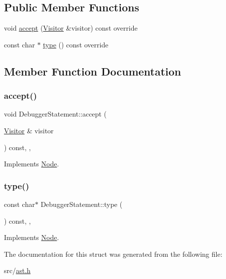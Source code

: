 \subsection*{Public Member Functions}
\begin{DoxyCompactItemize}
\item 
void \hyperlink{struct_debugger_statement_adb69027b0b27e1a8f74f4ddea5957799}{accept} (\hyperlink{struct_visitor}{Visitor} \&visitor) const override
\item 
const char $\ast$ \hyperlink{struct_debugger_statement_a3484d4e9900b72324bf5eb55da9492dd}{type} () const override
\end{DoxyCompactItemize}


\subsection{Member Function Documentation}
\mbox{\label{struct_debugger_statement_adb69027b0b27e1a8f74f4ddea5957799}} 
\subsubsection{\texorpdfstring{accept()}{accept()}}
{\footnotesize\ttfamily void Debugger\+Statement\+::accept (\begin{DoxyParamCaption}\item[{\hyperlink{struct_visitor}{Visitor} \&}]{visitor }\end{DoxyParamCaption}) const\hspace{0.3cm}{\ttfamily [inline]}, {\ttfamily [override]}, {\ttfamily [virtual]}}



Implements \hyperlink{struct_node_a10bd7af968140bbf5fa461298a969c71}{Node}.

\mbox{\label{struct_debugger_statement_a3484d4e9900b72324bf5eb55da9492dd}} 
\subsubsection{\texorpdfstring{type()}{type()}}
{\footnotesize\ttfamily const char$\ast$ Debugger\+Statement\+::type (\begin{DoxyParamCaption}{ }\end{DoxyParamCaption}) const\hspace{0.3cm}{\ttfamily [inline]}, {\ttfamily [override]}, {\ttfamily [virtual]}}



Implements \hyperlink{struct_node_a82f29420d0a38efcc370352528e94e9b}{Node}.



The documentation for this struct was generated from the following file\+:\begin{DoxyCompactItemize}
\item 
src/\hyperlink{ast_8h}{ast.\+h}\end{DoxyCompactItemize}
